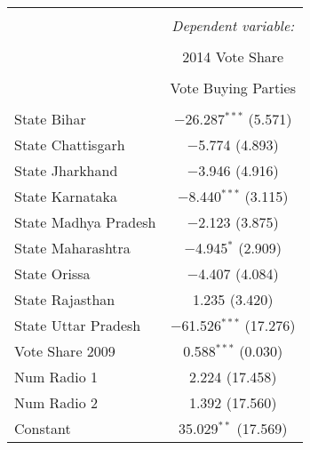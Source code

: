 
\begin{table}[!htbp] \centering 
\begin{tabular}{@{\extracolsep{5pt}}lc} 
\\[-1.8ex]\hline 
\hline \\[-1.8ex] 
 & \multicolumn{1}{c}{\textit{Dependent variable:}} \\ 
\cline{2-2} 
\\[-1.8ex] & 2014 Vote Share \\ 
\\[-1.8ex] & Vote Buying Parties \\ 
\hline \\[-1.8ex] 
  State Bihar & $-$26.287$^{***}$ (5.571) \\ 
  State Chattisgarh & $-$5.774 (4.893) \\ 
  State Jharkhand & $-$3.946 (4.916) \\ 
  State Karnataka & $-$8.440$^{***}$ (3.115) \\ 
  State Madhya Pradesh & $-$2.123 (3.875) \\ 
  State Maharashtra & $-$4.945$^{*}$ (2.909) \\ 
  State Orissa & $-$4.407 (4.084) \\ 
  State Rajasthan & 1.235 (3.420) \\ 
  State Uttar Pradesh & $-$61.526$^{***}$ (17.276) \\ 
  Vote Share 2009 & 0.588$^{***}$ (0.030) \\ 
  Num Radio 1 & 2.224 (17.458) \\ 
  Num Radio 2 & 1.392 (17.560) \\ 
  Constant & 35.029$^{**}$ (17.569) \\ 
 \hline 
\end{tabular} 
\end{table} 
